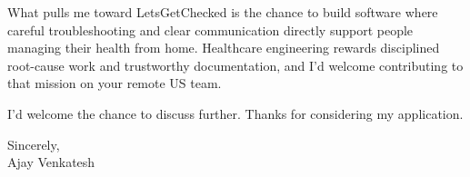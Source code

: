 \documentclass[letterpaper,11pt]{article}
\begin{document}
What pulls me toward LetsGetChecked is the chance to build software where careful troubleshooting and clear communication directly support people managing their health from home. Healthcare engineering rewards disciplined root-cause work and trustworthy documentation, and I'd welcome contributing to that mission on your remote US team.

I'd welcome the chance to discuss further. Thanks for considering my application.

\vspace{12pt}
Sincerely, \\
Ajay Venkatesh
\end{document}
